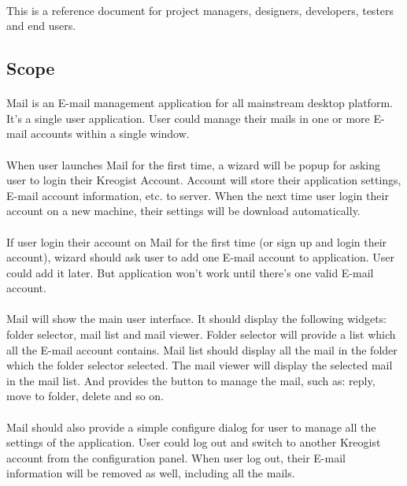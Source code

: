 \documentclass[11pt,a4paper]{article}
\begin{document}
            \paragraph{} This is a reference document for project managers, designers, developers, testers and end users.
        \subsection{Scope}
            \paragraph{} Mail is an E-mail management application for all mainstream desktop platform. It's a single user application. User could manage their mails in one or more E-mail accounts within a single window.
            \paragraph{} When user launches Mail for the first time, a wizard will be popup for asking user to login their Kreogist Account. Account will store their application settings, E-mail account information, etc. to server. When the next time user login their account on a new machine, their settings will be download automatically.
            \paragraph{} If user login their account on Mail for the first time (or sign up and login their account), wizard should ask user to add one E-mail account to application. User could add it later. But application won't work until there's one valid E-mail account.
            \paragraph{} Mail will show the main user interface. It should display the following widgets: folder selector, mail list and mail viewer. Folder selector will provide a list which all the E-mail account contains. Mail list should display all the mail in the folder which the folder selector selected. The mail viewer will display the selected mail in the mail list. And provides the button to manage the mail, such as: reply, move to folder, delete and so on.
            \paragraph{} Mail should also provide a simple configure dialog for user to manage all the settings of the application. User could log out and switch to another Kreogist account from the configuration panel. When user log out, their E-mail information will be removed as well, including all the mails.
\end{document}

